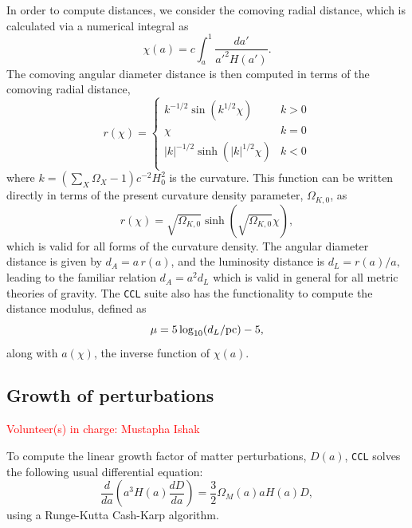 \documentclass[\docopts]{\docclass}
\newcommand{\vol}[1]{\textcolor{red}{Volunteer(s) in charge: #1}}
\newcommand{\ccl}{{\tt CCL}\xspace}
\begin{document}
In order to compute distances, we consider the comoving radial distance, which is calculated via a numerical integral as
\begin{equation}
 \chi(a)= c \int_a^1 \frac{da'}{a'^2 H(a')}.
\end{equation}
The comoving angular diameter distance
is then computed in terms of the comoving radial distance,
\begin{equation}\label{eq:angdist}
 r(\chi)=\left\{\begin{array}{cc}
                 k^{-1/2}\sin(k^{1/2}\chi) & k>0\\
                 \chi & k=0\\
                 |k|^{-1/2}\sinh(|k|^{1/2}\chi) & k<0\\
                \end{array}\right.
\end{equation}
where $k = \left({\sum_X \Omega_X -1}\right) c^{-2} H_0^2$ is the curvature.
This function can be written directly in terms of the present curvature density parameter, $\Omega_{K,0}$, as
\begin{equation}\label{eq:angdist_omegak}
 r(\chi) = \sqrt{\Omega_{K,0}}\sinh(\sqrt{\Omega_{K,0}}\chi),
\end{equation}
which is valid for all forms of the curvature density.
The angular diameter distance is given by $d_A=a\,r(a)$, and the luminosity distance is
$d_L=r(a)/a,$ leading to the familiar relation $d_A = a^2d_L$ which is valid in general for all metric theories of gravity.
The \ccl suite also has the functionality to compute the distance modulus, defined as
\begin{equation}\label{eq:distmod}
    \mu = 5 \log_{10}(d_L / {\rm pc})-5,
\end{equation}
along with $a(\chi)$, the inverse function of $\chi(a)$.


\subsection{Growth of perturbations}
\vol{Mustapha Ishak}
\label{sec:growth}

To compute the linear growth factor of matter perturbations, $D(a)$, \ccl solves the following usual differential equation:
\begin{equation}
  \frac{d}{da}\left(a^3H(a)\frac{dD}{da}\right)=\frac{3}{2}\Omega_M(a)aH(a)D,
\end{equation}
using a Runge-Kutta Cash-Karp algorithm. 
\end{document}
